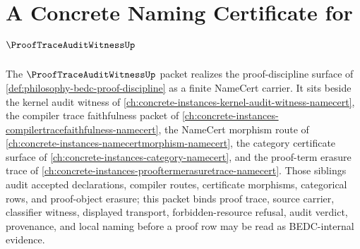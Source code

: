 \chapter{A Concrete Naming Certificate for $\ProofTraceAuditWitnessUp$}
\label{ch:concrete-instances-prooftraceauditwitness-namecert}

The $\ProofTraceAuditWitnessUp$ packet realizes the proof-discipline surface of \autoref{def:philosophy-bedc-proof-discipline} as a finite NameCert carrier. It sits beside the kernel audit witness of \autoref{ch:concrete-instances-kernel-audit-witness-namecert}, the compiler trace faithfulness packet of \autoref{ch:concrete-instances-compilertracefaithfulness-namecert}, the NameCert morphism route of \autoref{ch:concrete-instances-namecertmorphism-namecert}, the category certificate surface of \autoref{ch:concrete-instances-category-namecert}, and the proof-term erasure trace of \autoref{ch:concrete-instances-prooftermerasuretrace-namecert}. Those siblings audit accepted declarations, compiler routes, certificate morphisms, categorical rows, and proof-object erasure; this packet binds proof trace, source carrier, classifier witness, displayed transport, forbidden-resource refusal, audit verdict, provenance, and local naming before a proof row may be read as BEDC-internal evidence.


